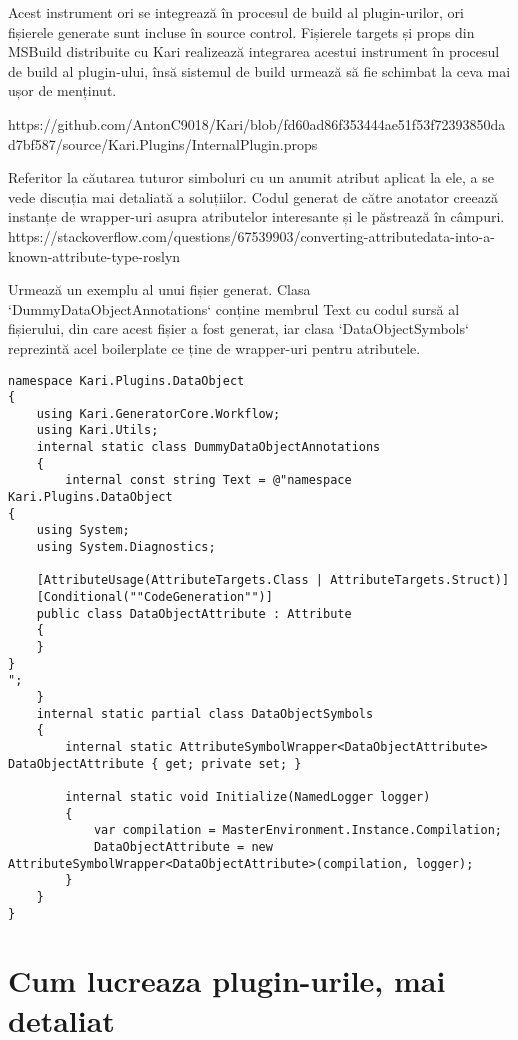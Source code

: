 \documentclass{report}
\begin{document}
Acest instrument ori se integrează în procesul de build al plugin-urilor, ori fișierele generate sunt incluse în source control.
Fișierele targets și props din MSBuild distribuite cu Kari realizează integrarea acestui instrument în procesul de build al plugin-ului,
însă sistemul de build urmează să fie schimbat la ceva mai ușor de menținut. 

https://github.com/AntonC9018/Kari/blob/fd60ad86f353444ae51f53f72393850dad7bf587/source/Kari.Plugins/InternalPlugin.props



Referitor la căutarea tuturor simboluri cu un anumit atribut aplicat la ele, a se vede discuția mai detaliată a soluțiilor.
Codul generat de către anotator creează instanțe de wrapper-uri asupra atributelor interesante și le păstrează în câmpuri.
https://stackoverflow.com/questions/67539903/converting-attributedata-into-a-known-attribute-type-roslyn


Urmează un exemplu al unui fișier generat.
Clasa `DummyDataObjectAnnotations` conține membrul Text cu codul sursă al fișierului, din care acest fișier a fost generat,
iar clasa `DataObjectSymbols` reprezintă acel boilerplate ce ține de wrapper-uri pentru atributele.

\begin{lstlisting}
namespace Kari.Plugins.DataObject
{
    using Kari.GeneratorCore.Workflow;
    using Kari.Utils;
    internal static class DummyDataObjectAnnotations
    {
        internal const string Text = @"namespace Kari.Plugins.DataObject
{
    using System;
    using System.Diagnostics;

    [AttributeUsage(AttributeTargets.Class | AttributeTargets.Struct)]
    [Conditional(""CodeGeneration"")]
    public class DataObjectAttribute : Attribute
    {
    }
}
";
    }
    internal static partial class DataObjectSymbols
    {
        internal static AttributeSymbolWrapper<DataObjectAttribute> DataObjectAttribute { get; private set; }

        internal static void Initialize(NamedLogger logger)
        {
            var compilation = MasterEnvironment.Instance.Compilation;
            DataObjectAttribute = new AttributeSymbolWrapper<DataObjectAttribute>(compilation, logger);
        }
    }
}
\end{lstlisting}

\section{Cum lucreaza plugin-urile, mai detaliat}
\end{document}

